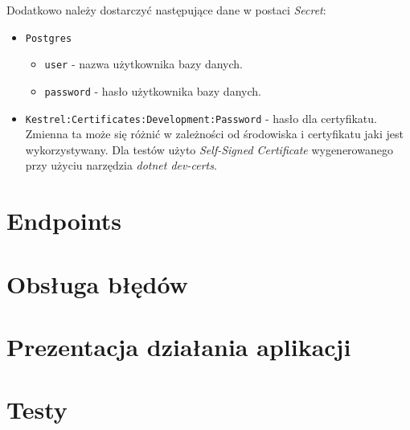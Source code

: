 \par Dodatkowo należy dostarczyć następujące dane w postaci \emph{\dotnet{} Secret}:
\begin{itemize}
	\item \texttt{Postgres}
	\begin{itemize}
		\item \texttt{user} - nazwa użytkownika bazy danych.
		\item \texttt{password} - hasło użytkownika bazy danych.
	\end{itemize}
	\item \texttt{Kestrel:Certificates:Development:Password} - hasło dla certyfikatu. Zmienna ta może się różnić w zależności od środowiska i certyfikatu jaki jest wykorzystywany. Dla testów użyto \emph{Self-Signed Certificate} wygenerowanego przy użyciu narzędzia \emph{dotnet dev-certs}.
\end{itemize}

\section{Endpoints}

\section{Obsługa błędów}

\section{Prezentacja działania aplikacji}

\section{Testy}

